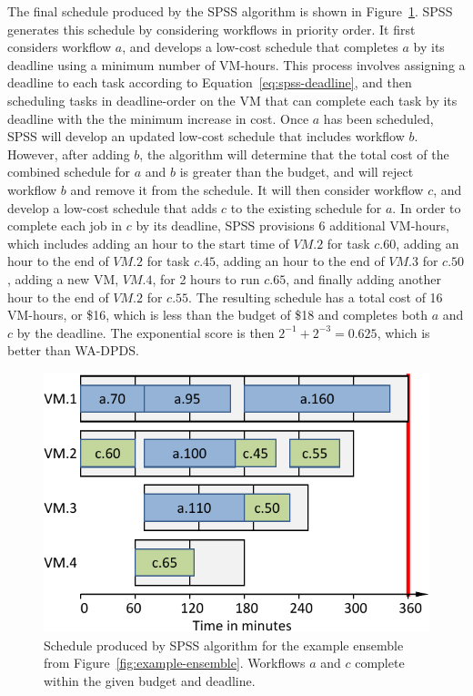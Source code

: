 \documentclass[preprint,5p]{elsarticle}
\begin{document}
The final schedule produced by the SPSS algorithm is shown in
Figure~\ref{fig:algorithms-example-spss}. SPSS generates this schedule by
considering workflows in priority order. It first considers workflow $a$, and
develops a low-cost schedule that completes $a$ by its deadline using a minimum
number of VM-hours. This process involves assigning a deadline to each task
according to Equation~\ref{eq:spss-deadline}, and then scheduling tasks in
deadline-order on the VM that can complete each task by its deadline with the
the minimum increase in cost. Once $a$ has been scheduled, SPSS will develop an
updated low-cost schedule that includes workflow $b$. However, after adding $b$,
the algorithm will determine that the total cost of the combined schedule
for $a$ and $b$ is greater than the budget, and will reject workflow $b$ and
remove it from the schedule. It will then consider workflow $c$, and develop
a low-cost schedule that adds $c$ to the existing schedule for $a$. In order
to complete each job in $c$ by its deadline, SPSS provisions 6 additional
VM-hours, which includes adding an hour to the start time of $VM.2$ for task
$c.60$, adding an hour to the end of $VM.2$ for task $c.45$, adding an hour
to the end of $VM.3$ for $c.50$, adding a new VM, $VM.4$, for 2 hours to run
$c.65$, and finally adding another hour to the end of $VM.2$ for $c.55$. The
resulting schedule has a total cost of 16 VM-hours, or \$16, which is less
than the budget of \$18 and completes both $a$ and $c$ by the deadline.
The exponential score is then $2^{-1}+2^{-3} = 0.625$, which is better than WA-DPDS.

\begin{figure}[htb] 
  \centering
  \includegraphics[width=0.80\columnwidth]{figures/algorithms-example-spss}
  \caption{Schedule produced by SPSS algorithm for the example ensemble from Figure~\ref{fig:example-ensemble}.
  Workflows $a$ and $c$ complete within the given budget and deadline.}
  \label{fig:algorithms-example-spss}
\end{figure}
\end{document}
